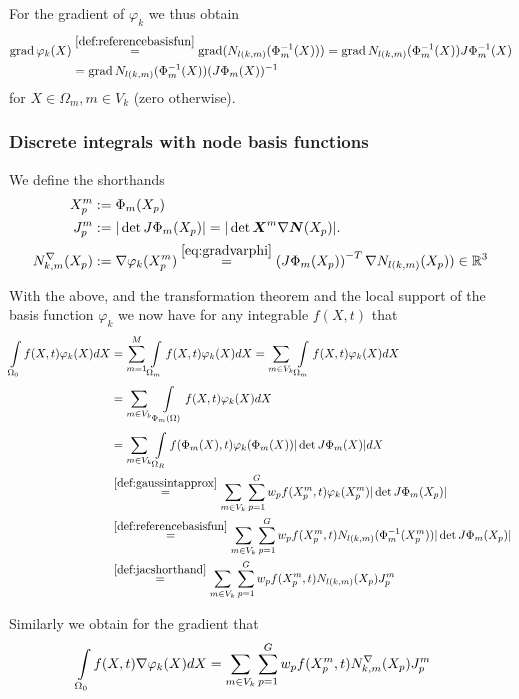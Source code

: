 For the gradient of $\varphi_k$ we thus obtain
\begin{align}
	\grad\varphi_k(X) &\re{def:referencebasisfun} \grad (N_{l(k,m)}(\Phi^{-1}_m(X)))
					  = \grad N_{l(k,m)}(\Phi^{-1}_m(X))J\Phi^{-1}_m(X)\nonumber\\
					  &= \grad N_{l(k,m)}(\Phi^{-1}_m(X))(J\Phi_m(X))^{-1}\label{eq:gradvarphi}
\end{align}
for $X\in\Omega_m, m\in V_k$ (zero otherwise).
 
\subsubsection{Discrete integrals with node basis functions}
We define the shorthands
\begin{align}
	\pmp &:= \Phi_m(X_p)\\
	\jmp &:= |\det J\Phi_m(X_p)| = |\det \vX^m\nabla\vN(X_p)|.\label{def:jacshorthand}\\
	\dNkmp &:= \nabla\varphi_k(\pmp) \re{eq:gradvarphi} \left(J\Phi_m(X_p)\right)^{-T}\nabla N_{l(k,m)}(X_p))\in\R^3\label{}
\end{align}

With the above, and the transformation theorem and the local support of the basis function $\varphi_k$ we now have for any integrable $f(X,t)$ that
\begin{align}
   \intl{\Or}{}f(X,t)\varphi_k(X)dX &= \suml{m=1}{M}\intl{\Omega_m}{}f(X,t)\varphi_k(X)dX = \sumvk\intl{\Omega_m}{}f(X,t)\varphi_k(X)dX\nonumber\\
    &= \sumvk\intl{\Phi_m(\Omega)}{}f(X,t)\varphi_k(X)dX\label{eq:fphidx}\nonumber\\
	&= \sumvk\intl{\Om}{}f(\Phi_m(X),t)\varphi_k(\Phi_m(X))|\det J\Phi_m(X)|dX\nonumber\\
	& \re{def:gaussintapprox} \sumvk\sumgp w_pf(\pmp,t)\varphi_k(\pmp)|\det J\Phi_m(X_p)|\nonumber\\
	& \re{def:referencebasisfun} \sumvk\sumgp w_pf(\pmp,t)N_{l(k,m)}(\Phi_m^{-1}(\pmp))|\det J\Phi_m(X_p)|\nonumber\\
	& \re{def:jacshorthand} \sumvk\sumgp w_pf(\pmp,t)N_{l(k,m)}(X_p)\jmp\label{eq:fphidx}
\end{align}

Similarly we obtain for the gradient that
\begin{align}
	\int\limits_{\Omega_0}^{}f(X,t)\nabla\varphi_k(X)dX &= \sum\limits_{m\in V_k}^{}\sum\limits_{p=1}^{G} w_pf(X^m_p,t)N^\nabla_{k,m}(X_p)J^m_p\label{eq:fgradphidx}
\end{align}